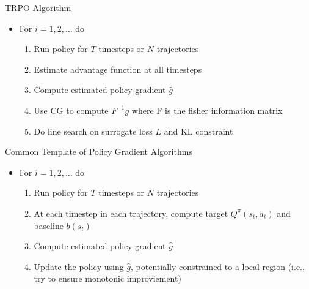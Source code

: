 \documentclass[aspectratio=169]{../latex_main/tntbeamer}  %
\begin{document}
\begin{frame}[c]{TRPO Algorithm~}

	\begin{itemize}
	    \item For $i= 1,2,\ldots$ do
	    \begin{enumerate}
	        \item Run policy for $T$ timesteps or $N$ trajectories
	        \item Estimate advantage function at all timesteps
	        \item Compute estimated policy gradient $\hat{g}$
	        \item Use CG to compute $F^{-1}g$ where F is the fisher information matrix
	        \item Do line search on surrogate loss $L$ and KL constraint
	    \end{enumerate}
	\end{itemize}



\end{frame}
\begin{frame}[c]{Common Template of Policy Gradient Algorithms}

	\begin{itemize}
	    \item For $i= 1,2,\ldots$ do
	    \begin{enumerate}
	        \item Run policy for $T$ timesteps or $N$ trajectories
	        \item At each timestep in each trajectory, compute target $Q^\pi(s_t, a_t)$ and baseline $b(s_t)$
	        \item Compute estimated policy gradient $\hat{g}$
	        \item Update the policy using $\hat{g}$, potentially constrained to a local region (i.e., try to ensure monotonic improviement)
	    \end{enumerate}
	\end{itemize}



\end{frame}
\end{document}
